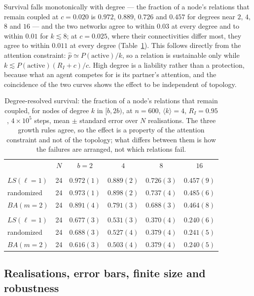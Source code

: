 \documentclass[aps,pre,twocolumn,superscriptaddress,floatfix,longbibliography]{revtex4-2}
\begin{document}
Survival falls monotonically with degree --- the fraction of a node's
relations that remain coupled at $c=0.020$ is $0.972$, $0.889$, $0.726$ and
$0.457$ for degrees near $2$, $4$, $8$ and $16$ --- and the two networks
agree to within $0.03$ at every degree and to within $0.01$ for $k\lesssim8$;
at $c=0.025$, where their connectivities differ most, they agree to within
$0.011$ at every degree (Table~\ref{tab:degree}). This follows directly from the attention
constraint:
$\hat p \simeq P(\text{active})/k$, so a relation is sustainable only while
$k \lesssim P(\text{active})(R_I+c)/c$. High degree is a liability rather than a
protection, because what an agent competes for is its partner's attention, and
the coincidence of the two curves shows the effect to be independent of
topology.

\begin{table}[t]
\caption{Degree-resolved survival: the fraction of a node's relations that
remain coupled, for nodes of degree $k$ in $[b,2b)$, at $n=600$,
$\langle k\rangle=4$, $R_I=0.95$, $4\times10^{5}$ steps, mean $\pm$ standard
error over $N$ realisations. The three growth rules agree, so the effect is a
property of the attention constraint and not of the topology; what differs
between them is how the failures are arranged, not which relations fail.}
\label{tab:degree}
\begin{ruledtabular}
\begin{tabular}{lccccc}
 & $N$ & $b=2$ & $4$ & $8$ & $16$ \\
\colrule
\multicolumn{6}{l}{$c=0.020$} \\
$LS(\ell=1)$ & 24 & $0.972(1)$ & $0.889(2)$ & $0.726(3)$ & $0.457(9)$ \\
randomized & 24 & $0.973(1)$ & $0.898(2)$ & $0.737(4)$ & $0.485(6)$ \\
$BA(m=2)$ & 24 & $0.891(4)$ & $0.791(3)$ & $0.688(3)$ & $0.464(8)$ \\
\colrule
\multicolumn{6}{l}{$c=0.025$} \\
$LS(\ell=1)$ & 24 & $0.677(3)$ & $0.531(3)$ & $0.370(4)$ & $0.240(6)$ \\
randomized & 24 & $0.688(3)$ & $0.527(4)$ & $0.379(4)$ & $0.241(5)$ \\
$BA(m=2)$ & 24 & $0.616(3)$ & $0.503(4)$ & $0.379(4)$ & $0.240(5)$ \\
\end{tabular}
\end{ruledtabular}
\end{table}

\subsection[Realisations, error bars, finite size and robustness]{Realisations, error bars, finite size and robustness}
\label{sec:netnumerics}
\end{document}
